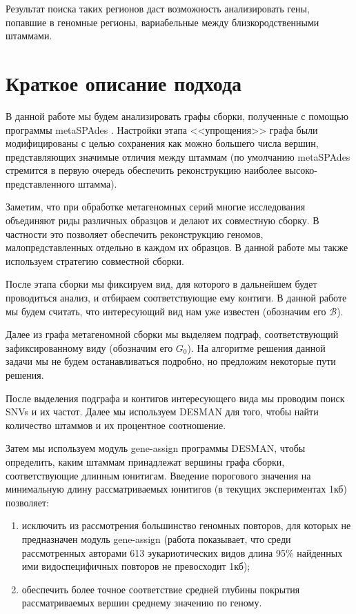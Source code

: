 \documentclass{spbau-diploma}
\begin{document}
Результат поиска таких регионов даст возможность анализировать гены, попавшие в геномные регионы, вариабельные между близкородственными штаммами.



\section{Краткое описание подхода}

В данной работе мы будем анализировать графы сборки, полученные с помощью программы metaSPAdes \cite{MetaSpades}. Настройки этапа <<упрощения>> графа были модифицированы с целью сохранения как можно большего числа вершин, представляющих значимые отличия между штаммам (по умолчанию metaSPAdes стремится в первую очередь обеспечить реконструкцию наиболее высоко-представленного штамма). 

Заметим, что при обработке метагеномных серий многие исследования объединяют риды различных образцов и делают их совместную сборку. 
В частности это позволяет обеспечить реконструкцию геномов, малопредставленных отдельно в каждом их образцов.
В данной работе мы также используем стратегию совместной сборки.

После этапа сборки мы фиксируем вид, для которого в дальнейшем будет проводиться анализ, и отбираем соответствующие ему контиги. В данной работе мы будем считать, что интересующий вид нам уже известен (обозначим его $\mathcal{B}$).

Далее из графа метагеномной сборки мы выделяем подграф, соответствующий зафиксированному виду (обозначим его $G_0$). На алгоритме решения данной задачи мы не будем останавливаться подробно, но предложим некоторые пути решения.

После выделения подграфа и контигов интересующего вида мы проводим поиск SNVs и их частот. Далее мы используем DESMAN для того, чтобы найти количество штаммов и их процентное соотношение. 

Затем мы используем модуль gene-assign программы DESMAN, чтобы определить, каким штаммам принадлежат вершины графа сборки, соответствующие длинным юнитигам. Введение порогового значения на минимальную длину рассматриваемых юнитигов (в текущих экспериментах 1кб) позволяет: 
\begin{enumerate}
    \item исключить из рассмотрения большинство геномных повторов, для которых не предназначен модуль gene-assign  (работа \cite{repeats} показывает, что среди рассмотренных авторами 613 эукариотических видов длина 95\% найденных ими видоспецифичных повторов не превосходит 1кб);
    \item обеспечить более точное соответствие средней глубины покрытия рассматриваемых вершин среднему значению по геному.
\end{enumerate}
 
\end{document}
